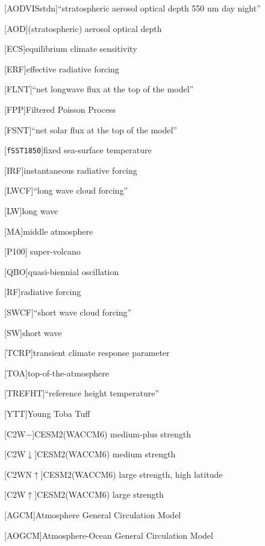 \documentclass{ametsocV5}
\begin{document}
\begin{acronym}[AODVISstdn]
  [AODVISstdn]{``stratospheric aerosol optical depth 550 nm day night''}

  [AOD]{(stratospheric) aerosol optical depth}

  [ECS]{equilibrium climate sensitivity}

  [ERF]{effective radiative forcing}

  [FLNT]{``net longwave flux at the top of the model''}

  [FPP]{Filtered Poisson Process}

  [FSNT]{``net solar flux at the top of the model''}

  [\texttt{fSST1850}]{fixed sea-surface temperature}

  [IRF]{instantaneous radiative forcing}

  [LWCF]{``long wave cloud forcing''}

  [LW]{long wave}

  [MA]{middle atmosphere}

  [P100]{\citet{jones2005} super-volcano}

  [QBO]{quasi-biennial oscillation}

  [RF]{radiative forcing}

  [SWCF]{``short wave cloud forcing''}

  [SW]{short wave}

  [TCRP]{transient climate response parameter}

  [TOA]{top-of-the-atmosphere}

  [TREFHT]{``reference height temperature''}

  [YTT]{Young Toba Tuff}

  [C2W\(-\)]{CESM2(WACCM6) medium-plus strength}

  [C2W\(\downarrow\)]{CESM2(WACCM6) medium strength}

  [C2WN\(\uparrow\)]{CESM2(WACCM6) large strength, high latitude}

  [C2W\(\uparrow\)]{CESM2(WACCM6) large strength}

  [AGCM]{Atmosphere General Circulation Model}

  [AOGCM]{Atmosphere-Ocean General Circulation Model}


\end{acronym}
\end{document}
